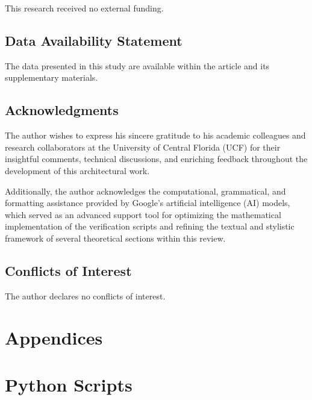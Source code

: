 \documentclass[energies,accept,oneauthor,pdftex]{Definitions/mdpi}
\begin{document}
This research received no external funding.

\subsection{Data Availability Statement}

The data presented in this study are available within the article and its supplementary materials.


\subsection{Acknowledgments}

The author wishes to express his sincere gratitude to his academic colleagues and research collaborators at the University of Central Florida (UCF) for their insightful comments, technical discussions, and enriching feedback throughout the development of this architectural work.

Additionally, the author acknowledges the computational, grammatical, and formatting assistance provided by Google's artificial intelligence (AI) models, which served as an advanced support tool for optimizing the mathematical implementation of the verification scripts and refining the textual and stylistic framework of several theoretical sections within this review.


\subsection*{Conflicts of Interest}

The author declares no conflicts of interest.





\section*{Appendices}


%
%
\appendix \setcounter{section}{0}


\section{Python Scripts}
\end{document}
